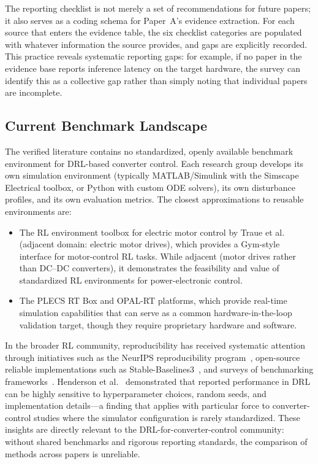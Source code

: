 \documentclass[manuscript,screen,review]{acmart}
\begin{document}
The reporting checklist is not merely a set of recommendations for future papers; it also serves as a coding schema for Paper~A's evidence extraction.
For each source that enters the evidence table, the six checklist categories are populated with whatever information the source provides, and gaps are explicitly recorded.
This practice reveals systematic reporting gaps: for example, if no paper in the evidence base reports inference latency on the target hardware, the survey can identify this as a collective gap rather than simply noting that individual papers are incomplete.

\subsection{Current Benchmark Landscape}

The verified literature contains no standardized, openly available benchmark environment for DRL-based converter control.
Each research group develops its own simulation environment (typically MATLAB/Simulink with the Simscape Electrical toolbox, or Python with custom ODE solvers), its own disturbance profiles, and its own evaluation metrics.
The closest approximations to reusable environments are:

\begin{itemize}
  \item The RL environment toolbox for electric motor control by Traue et al.~\cite{traue2020toward} (adjacent domain: electric motor drives), which provides a Gym-style interface for motor-control RL tasks. While adjacent (motor drives rather than DC--DC converters), it demonstrates the feasibility and value of standardized RL environments for power-electronic control.
  \item The PLECS RT Box and OPAL-RT platforms, which provide real-time simulation capabilities that can serve as a common hardware-in-the-loop validation target, though they require proprietary hardware and software.
\end{itemize}

In the broader RL community, reproducibility has received systematic attention through initiatives such as the NeurIPS reproducibility program~\cite{pineau2021improving}, open-source reliable implementations such as Stable-Baselines3~\cite{raffin2021stable}, and surveys of benchmarking frameworks~\cite{stapelberg2020survey}.
Henderson et al.~\cite{henderson2018deep} demonstrated that reported performance in DRL can be highly sensitive to hyperparameter choices, random seeds, and implementation details---a finding that applies with particular force to converter-control studies where the simulator configuration is rarely standardized.
These insights are directly relevant to the DRL-for-converter-control community: without shared benchmarks and rigorous reporting standards, the comparison of methods across papers is unreliable.
\end{document}
